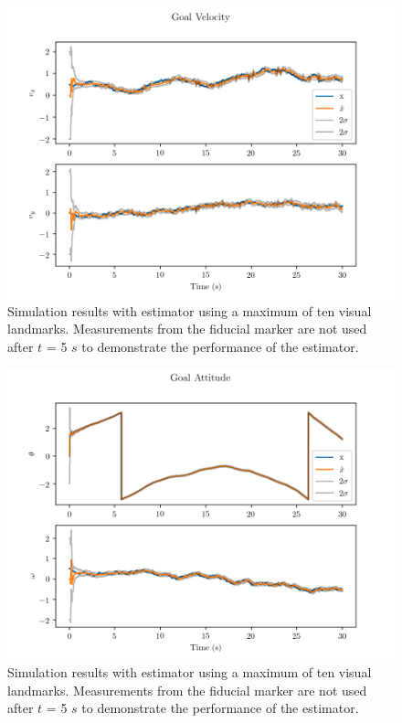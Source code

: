 \begin{figure}
  \centering
  \includegraphics[scale=0.5]{plots/with_lms_gv.png}
  \caption{Simulation results with estimator using a maximum of ten visual
  landmarks. Measurements from the fiducial marker are not used after $t$ = 5
$s$ to demonstrate the performance of the estimator.}
  \label{fig:with_lms_gv}
\end{figure}

\begin{figure}
  \centering
  \includegraphics[scale=0.5]{plots/with_lms_gatt.png}
  \caption{Simulation results with estimator using a maximum of ten visual
  landmarks. Measurements from the fiducial marker are not used after $t$ = 5
$s$ to demonstrate the performance of the estimator.}
  \label{fig:with_lms_gatt}
\end{figure}

